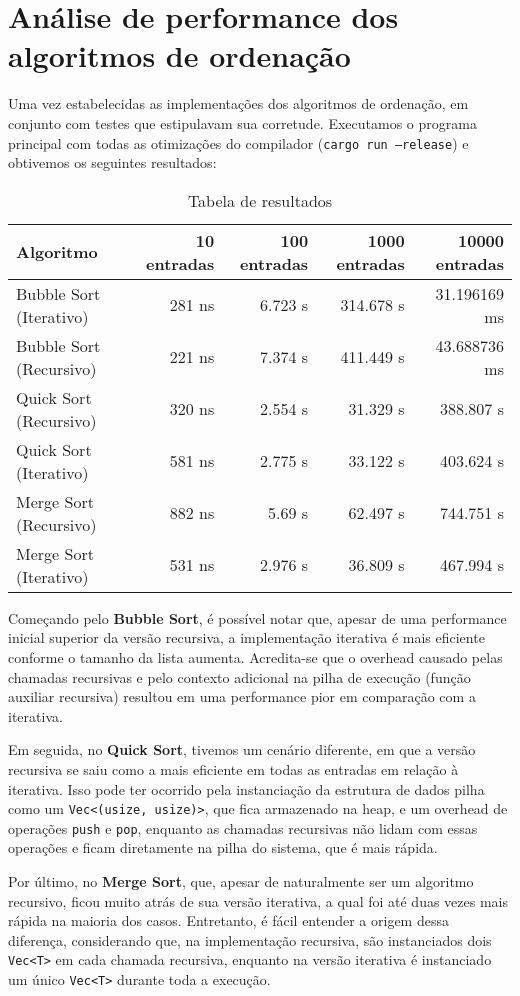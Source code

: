 \section{Análise de performance dos algoritmos de ordenação}
\label{sec:anal_perf_algo_ord}

Uma vez estabelecidas as implementações dos algoritmos de ordenação, em conjunto com testes que estipulavam sua corretude. Executamos o programa principal com todas as otimizações do compilador (\texttt{cargo run ---release}) e obtivemos os seguintes resultados:

\begin{table}[h!]
	\centering
	\caption{Tabela de resultados}
	\label{tab:perf_result}
	\begin{tabular}{lrrrr}
		\toprule
		Algoritmo               & 10 entradas & 100 entradas    & 1000 entradas     & 10000 entradas    \\
		\midrule
		Bubble Sort (Iterativo) & 281 ns      & 6.723 \textmu s & 314.678 \textmu s & 31.196169 ms      \\
		Bubble Sort (Recursivo) & 221 ns      & 7.374 \textmu s & 411.449 \textmu s & 43.688736 ms      \\
		Quick Sort  (Recursivo) & 320 ns      & 2.554 \textmu s & 31.329 \textmu s  & 388.807 \textmu s \\
		Quick Sort  (Iterativo) & 581 ns      & 2.775 \textmu s & 33.122 \textmu s  & 403.624 \textmu s \\
		Merge Sort  (Recursivo) & 882 ns      & 5.69 \textmu s  & 62.497 \textmu s  & 744.751 \textmu s \\
		Merge Sort  (Iterativo) & 531 ns      & 2.976 \textmu s & 36.809 \textmu s  & 467.994 \textmu s \\
		\bottomrule
	\end{tabular}
\end{table}

Começando pelo \textbf{Bubble Sort}, é possível notar que, apesar de uma performance inicial superior da versão recursiva, a implementação iterativa é mais eficiente conforme o tamanho da lista aumenta. Acredita-se que o overhead causado pelas chamadas recursivas e pelo contexto adicional na pilha de execução (função auxiliar recursiva) resultou em uma performance pior em comparação com a iterativa.

Em seguida, no \textbf{Quick Sort}, tivemos um cenário diferente, em que a versão recursiva se saiu como a mais eficiente em todas as entradas em relação à iterativa. Isso pode ter ocorrido pela instanciação da estrutura de dados pilha como um \texttt{Vec<(usize, usize)>}, que fica armazenado na heap, e um overhead de operações \texttt{push} e \texttt{pop}, enquanto as chamadas recursivas não lidam com essas operações e ficam diretamente na pilha do sistema, que é mais rápida.

Por último, no \textbf{Merge Sort}, que, apesar de naturalmente ser um algoritmo recursivo, ficou muito atrás de sua versão iterativa, a qual foi até duas vezes mais rápida na maioria dos casos. Entretanto, é fácil entender a origem dessa diferença, considerando que, na implementação recursiva, são instanciados dois \texttt{Vec<T>} em cada chamada recursiva, enquanto na versão iterativa é instanciado um único \texttt{Vec<T>} durante toda a execução.

